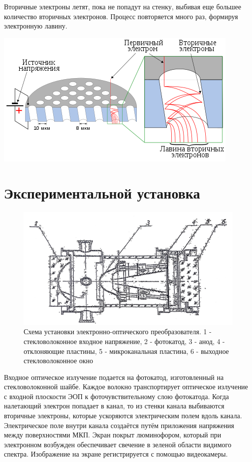Вторичные электроны летят, пока не попадут на стенку, выбивая еще большее количество вторичных электронов. Процесс повторяется много раз, формируя электронную лавину.

\begin{center}
    \includegraphics[scale = 0.8]{микроканальная пластина.png}
\end{center}

\section*{Экспериментальной установка}
\begin{figure}[h!]
    \centering
    \includegraphics[width=350pt]{IMG_8962.png}
    \caption{Схема установки электронно-оптического преобразователя. 1 - стекловолоконное входное напряжение, 2 - фотокатод, 3 - анод, 4 - отклоняющие пластины, 5 - микроканальная пластина, 6 - выходное стекловолоконное окно}
    \label{установка}
\end{figure}
Входное оптическое излучение подается на фотокатод, изготовленный на стекловолоконной шайбе. Каждое волокно транспортирует оптическое излучение с входной плоскости ЭОП к фоточувствительному слою фотокатода. Когда налетающий электрон попадает в канал, то из стенки канала выбиваются вторичные электроны, которые ускоряются электрическим полем вдоль канала. Электрическое поле внутри канала создаётся путём приложения напряжения между поверхностями МКП. Экран покрыт люминофором, который при электронном возбужден обеспечивает свечение в зеленой области видимого спектра. Изображение на экране регистрируется с помощью видеокамеры.


